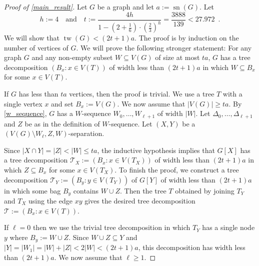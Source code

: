 \documentclass{patmorin}
\newcommand{\pat}[1]{\textcolor{Blue}{[Pat: #1]}}
\DeclareMathOperator{\sep}{sn}
\DeclareMathOperator{\tw}{tw}
\newcommand{\hussein}[1]{\textcolor{purple}{HH: #1}}
\begin{document}

\begin{proof}[Proof of \cref{main_result}]
  Let $G$ be a graph and let $a:=\sep(G)$.  Let
  \[
    h:=4 \quad\text{and}\quad t:=\frac{4h}{1-(2+\tfrac{1}{6})\cdot(\tfrac{2}{3})^{h}} = \frac{3888}{139} < 27.972 \enspace .
  \]
  We will show that $\tw(G)< (2t+1)a$. The proof is by induction on the number of vertices of $G$. We will prove the following stronger statement: For any graph $G$ and any non-empty subset $W\subseteq V(G)$ of size at most $ta$, $G$ has a tree decomposition $(B_x:x\in V(T))$ of width less than $(2t+1)a$ in which $W\subseteq B_x$ for some $x\in V(T)$.

  If $G$ has less than $ta$ vertices, then the proof is trivial. We use a tree $T$ with a single vertex $x$ and set $B_x:=V(G)$.  We now assume that $|V(G)|\ge ta$.
  By \cref{w_sequence}, $G$ has a $W$-sequence $W_0,\ldots,W_{\ell+1}$ of width $|W|$.   Let $\Delta_0,\ldots,\Delta_{\ell+1}$ and $Z$ be as in the definition of $W$-sequence.  Let $(X,Y)$ be a $(V(G)\setminus W_{\ell},Z,W)$-separation.

  Since $|X\cap Y|=|Z|<|W|\le ta$, the inductive hypothesis implies that $G[X]$ has a tree decomposition $\mathcal{T}_X:=(B_x:x\in V(T_X))$ of width less than $(2t+1)a$ in which $Z\subseteq B_x$ for some $x \in V(T_X)$. To finish the proof, we construct a tree decomposition $\mathcal{T}_Y:=(B_y:y\in V(T_Y))$ of $G[Y]$ of width less than $(2t+1)a$ in which some bag $B_{y}$ contains $W\cup Z$.  Then the tree $T$ obtained by joining $T_Y$ and $T_X$ using the edge $x y$ gives the desired tree decomposition $\mathcal{T}:=(B_x:x\in V(T))$.

  If $\ell=0$ then we use the trivial tree decomposition in which $T_Y$ has a single node $y$ where $B_{y}:=W\cup Z$.  Since $W\cup Z\subseteq Y$ and $|Y|=|W_1|=|W|+|Z|< 2|W|<(2t+1)a$, this decomposition has width less than $(2t+1)a$. We now assume that $\ell \ge  1$.




\end{proof}
\end{document}
